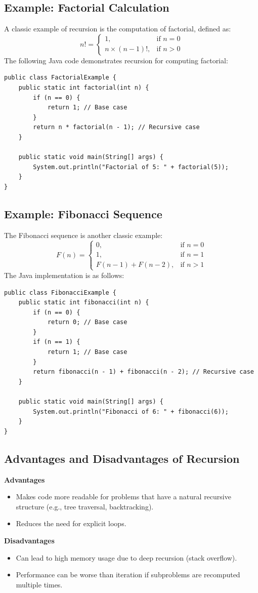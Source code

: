 \documentclass[letterpaper,12pt]{article}
\begin{document}
\subsection{Example: Factorial Calculation}
A classic example of recursion is the computation of factorial, defined as:
$$
    n! = \begin{cases} 
        1, & \text{if } n = 0 \\ 
        n \times (n-1)!, & \text{if } n > 0
    \end{cases}
$$
The following Java code demonstrates recursion for computing factorial:
\begin{verbatim}
public class FactorialExample {
    public static int factorial(int n) {
        if (n == 0) {
            return 1; // Base case
        }
        return n * factorial(n - 1); // Recursive case
    }
    
    public static void main(String[] args) {
        System.out.println("Factorial of 5: " + factorial(5));
    }
}
\end{verbatim}
\subsection{Example: Fibonacci Sequence}
The Fibonacci sequence is another classic example:
\[
    F(n) = \begin{cases} 
        0, & \text{if } n = 0 \\ 
        1, & \text{if } n = 1 \\ 
        F(n-1) + F(n-2), & \text{if } n > 1
    \end{cases}
\]
The Java implementation is as follows:
\begin{verbatim}
public class FibonacciExample {
    public static int fibonacci(int n) {
        if (n == 0) {
            return 0; // Base case
        }
        if (n == 1) {
            return 1; // Base case
        }
        return fibonacci(n - 1) + fibonacci(n - 2); // Recursive case
    }
    
    public static void main(String[] args) {
        System.out.println("Fibonacci of 6: " + fibonacci(6));
    }
}
\end{verbatim}
\subsection{Advantages and Disadvantages of Recursion}
\textbf{Advantages}
\begin{itemize}
    \item Makes code more readable for problems that have a natural recursive structure (e.g., tree traversal, backtracking).
    \item Reduces the need for explicit loops.
\end{itemize}
\textbf{Disadvantages}
\begin{itemize}
    \item Can lead to high memory usage due to deep recursion (stack overflow).
    \item Performance can be worse than iteration if subproblems are recomputed multiple times.
\end{itemize}
\end{document}
